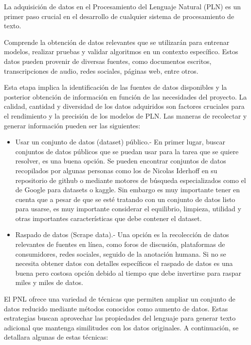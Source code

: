 La adquisición de datos en el Procesamiento del Lenguaje Natural (PLN) es un primer paso crucial en el desarrollo de cualquier sistema de procesamiento de texto.

Comprende la obtención de datos relevantes que se utilizarán para entrenar modelos, realizar pruebas y validar algoritmos en un contexto específico. Estos datos pueden provenir de diversas fuentes, como documentos escritos, transcripciones de audio, redes sociales, páginas web, entre otros.

Esta etapa implica la identificación de las fuentes de datos disponibles y la posterior obtención  de información en función de las necesidades del proyecto. La calidad, cantidad y diversidad de los datos adquiridos son factores cruciales para el rendimiento y la precisión de los modelos de PLN.  Las maneras de recolectar y generar información pueden ser las siguientes:

\begin{itemize}

	\item Usar un conjunto de datos (dataset)  público.- En primer lugar, buscar conjuntos de datos públicos que se puedan usar para la tarea que se quiere resolver, es una buena opción. Se pueden encontrar conjuntos de datos recopilados por algunas personas como los de Nicolas Iderhoff en su repositorio de github o mediante motores de búsqueda especializados como el de Google para datasets o kaggle. Sin embargo es muy importante tener en cuenta que a pesar de que se esté tratando con un conjunto de datos listo para usarse, es muy importante considerar el equilibrio, limpieza, utilidad y otras importantes características que debe contener el dataset.
	
	\item Raspado de datos (Scrape data).-  Una opción es la recolección de datos relevantes de fuentes en línea, como foros de discusión, plataformas de consumidores, redes sociales, seguido de la anotación humana. Si no se necesita obtener datos con detalles específicos el raspado de datos es una buena pero costosa opción debido al tiempo que debe invertirse para raspar miles y miles de datos.

\end{itemize}



El PNL ofrece una variedad de técnicas que permiten ampliar un conjunto de datos reducido mediante métodos conocidos como aumento de datos. Estas estrategias buscan aprovechar las propiedades del lenguaje para generar texto adicional que mantenga similitudes con los datos originales. A continuación, se detallara algunas de estas técnicas:

